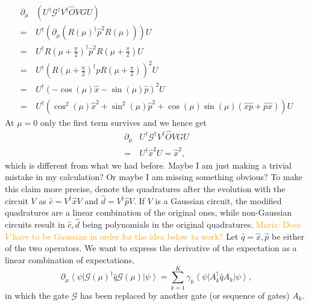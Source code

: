 \documentclass[aps,pra,10pt,twocolumn,groupedaddress,nofootinbib]{revtex4-1}
\theoremstyle{plain}
\newcommand{\ket}[1]{\ensuremath{\left| #1 \right \rangle}}
\newcommand{\bra}[1]{\ensuremath{\left \langle #1 \right |}}
\newcommand{\x}{\hat{x}}
\newcommand{\p}{\hat{p}}
\renewcommand{\c}{\hat{c}}
\renewcommand{\d}{\hat{d}}
\newcommand{\G}{\mathcal{G}}
\newcommand{\maria}[1]{\textcolor{orange}{Maria: #1}}
\begin{document}
{\begin{align}
  \partial_\mu &(U^\dagger \G^\dagger V^\dagger \hat{O} V G U) \nonumber\\
  = &U^\dagger (\partial_\mu( R(\mu)^\dagger \hat{p}^2 R(\mu) )) U \\
  = &U^\dagger R(\mu+\frac{\pi}{2})^\dagger \hat{p}^2 R(\mu+\frac{\pi}{2}) U \\
  = &U^\dagger (R(\mu+\frac{\pi}{2})^\dagger \hat{p} R(\mu+\frac{\pi}{2}))^2 U \\
  = &U^\dagger (-\cos(\mu) \hat{x} - \sin(\mu) \hat{p})^2 U \\
  = &U^\dagger (\cos^2(\mu) \hat{x}^2 + \sin^2(\mu) \hat{p}^2 + \cos(\mu) \sin(\mu) (\hat{x} \hat{p} + \hat{p} \hat{x})) U
\end{align}
At $\mu = 0$ only the first term survives and we hence get
\begin{align}
  \partial_\mu &U^\dagger \G^\dagger V^\dagger \hat{O} V G U \nonumber\\
    = &U^\dagger \hat{x}^2 U = \hat{x}^2 ,
\end{align}
which is different from what we had before.
Maybe I am just making a trivial mistake in my calculation? Or maybe I am missing something obvious?
}
To make this claim more precise, denote the quadratures after the evolution with the circuit $V$ as $\c = V^{\dagger} \x V$ and $\d = V^{\dagger} \p V$. If $V$ is a Gaussian circuit, the modified quadratures are a linear combination of the original ones, while non-Gaussian circuits result in $\c, \d$ being polynomials in the original quadratures. \maria{Does $V$ have to be Gaussian in order for the idea below to work? }
Let $\hat{q} = \x, \p$ be either of the two operators. We want to express the derivative of the expectation as a linear combination of expectations,
\begin{equation}
	\partial_{\mu}\bra{\psi} \G(\mu)^{\dagger} \hat{q} \G(\mu) \ket{\psi} = \sum_{k=1}^K \gamma_k \bra{\psi} A_k^{\dagger} \hat{q} A_k \ket{\psi},
	\label{Eq:sumofsympl}
\end{equation}
in which the gate $\G$ has been replaced by another gate (or sequence of gates) $A_k$. \\
\end{document}

